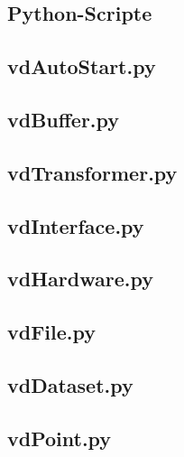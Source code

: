 \documentclass[a4paper,12pt,bibliography=totoc, listof=totoc,titlepage]{scrreprt}
\begin{document}
\begin{appendices}

\chapter{Python-Scripte}
\section{vdAutoStart.py}
\label{vdAutoStart.py}


\section{vdBuffer.py}
\label{vdBuffer.py}


\section{vdTransformer.py}
\label{vdTransformer.py}


\section{vdInterface.py}
\label{vdInterface.py}


\section{vdHardware.py}
\label{vdHardware.py}


\section{vdFile.py}
\label{vdFile.py}


\section{vdDataset.py}
\label{vdDataset.py}


\section{vdPoint.py}
\label{vdPoint.py}



\end{appendices}
\end{document}
